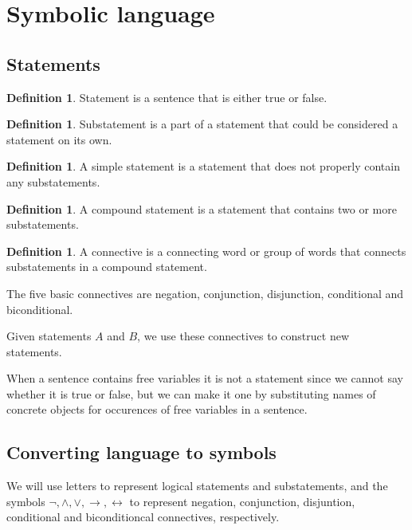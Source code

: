 \documentclass[letterpaper, 10pt]{article}
\theoremstyle{definition}
\newtheorem{define}[thm]{Definition}
\begin{document}
\section{Symbolic language}
\subsection{Statements}

\begin{define}
	Statement is a sentence that is either true or false.
\end{define}

\begin{define}
	Substatement is a part of a statement that could be considered a statement
	on its own.
\end{define}

\begin{define}
	A simple statement is a statement that does not properly contain any
	substatements.
\end{define}

\begin{define}
	A compound statement is a statement that contains two or more substatements.
\end{define}

\begin{define}
	A connective is a connecting word or group of words that connects
	substatements in a compound statement.
\end{define}

The five basic connectives are negation, conjunction, disjunction, conditional
and biconditional.

Given statements $A$ and $B$, we use these connectives to construct new
statements.

When a sentence contains free variables it is not a statement since we cannot
say whether it is true or false, but we can make it one by substituting names of
concrete objects for occurences of free variables in a sentence.

\subsection{Converting language to symbols}

We will use letters to represent logical statements and substatements, and the
symbols $\neg, \land, \lor, \rightarrow, \leftrightarrow$ to represent negation,
conjunction, disjuntion, conditional and biconditioncal connectives,
respectively.
\end{document}
